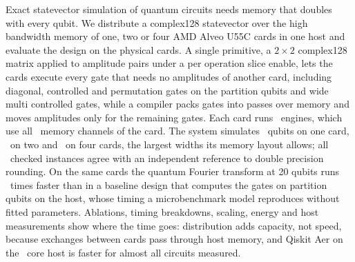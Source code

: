 Exact statevector simulation of quantum circuits needs memory that doubles with every qubit. We distribute a complex128
statevector over the high bandwidth memory of one, two or four AMD Alveo U55C cards in one host and evaluate the design
on the physical cards. A single primitive, a $2\times2$ complex128 matrix applied to amplitude pairs under a per
operation slice enable, lets the cards execute every gate that needs no amplitudes of another card, including diagonal,
controlled and permutation gates on the partition qubits and wide multi controlled gates, while a compiler packs gates
into passes over memory and moves amplitudes only for the remaining gates. Each card runs \NumEnginesFlagship~engines, which use all \NumPcsUsedFlagship~memory
channels of the card. The system simulates \NumMaxWidthOneCard~qubits on one card, \NumMaxWidthTwoCards~on two and \NumMaxWidthFourCards~on four cards,
the largest widths its memory layout allows; all \NumCorrectnessInstances~checked instances agree with an independent reference to double precision rounding.
On the same cards the quantum Fourier transform at 20 qubits runs \NumSubmittedOverRevisedQftTwenty~times faster than
in a baseline design that computes the gates on partition qubits on the host, whose timing a microbenchmark model reproduces without fitted parameters. Ablations, timing
breakdowns, scaling, energy and host measurements show where the time goes: distribution adds capacity, not speed,
because exchanges between cards pass through host memory, and Qiskit Aer on the \NumHostCores~core host is faster for almost all
circuits measured.
